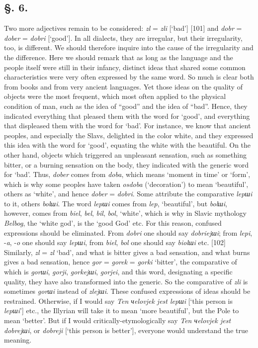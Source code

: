 \subsection*{\hspace*{\fill}§. 6.\hspace*{\fill}}

Two more adjectives remain to be considered: \textit{zl} = \textit{zli} [‘bad’] [101] and \textit{dobr} = \textit{dober} = \textit{dobri} [‘good’]. In all dialects, they are irregular, but their irregularity, too, is different. We should therefore inquire into the cause of the irregularity and the difference. Here we should remark that as long as the language and the people itself were still in their infancy, distinct ideas that shared some common characteristics were very often expressed by the same word. So much is clear both from books and from very ancient languages. Yet those ideas on the quality of objects were the most frequent, which most often applied to the physical condition of man, such as the idea of “good” and the idea of “bad”. Hence, they indicated everything that pleased them with the word for ‘good’, and everything that displeased them with the word for ‘bad’. For instance, we know that ancient peoples, and especially the Slavs, delighted in the color white, and they expressed this idea with the word for ‘good’, equating the white with the beautiful. On the other hand, objects which triggered an unpleasant sensation, such as something bitter, or a burning sensation on the body, they indicated with the generic word for ‘bad’. Thus, \textit{dober} comes from \textit{doba}, which means ‘moment in time’ or ‘form’, which is why some peoples have taken \textit{osdoba} (‘decoration’) to mean ‘beautiful’, others as ‘white’, and hence \textit{dober} = \textit{dobri}. Some attribute the comparative \textit{lepшi} to it, others \textit{bolшi}. The word \textit{lepшi} comes from \textit{lep}, ‘beautiful’, but \textit{bolшi}, however, comes from \textit{biel}, \textit{bel}, \textit{bil}, \textit{bol}, ‘white’, which is why in Slavic mythology \textit{Belbog}, the ‘white god’, is the ‘good God’ etc. For this reason, confused expressions should be eliminated. From \textit{dobri} one should say \textit{dobriejшi}; from \textit{lepi}, -\textit{a}, -\textit{o} one should say \textit{lepшi}, from \textit{biel}, \textit{bol} one should say \textit{biolшi} etc. [102] Similarly, \textit{zl} = \textit{zl} ‘bad’, and what is bitter gives a bad sensation, and what burns gives a bad sensation, hence \textit{gor} = \textit{gorek} = \textit{gorki} ‘bitter’, the comparative of which is \textit{gorшi}, \textit{gorji}, \textit{gorkejшi}, \textit{gorjei}, and this word, designating a specific quality, they have also transformed into the generic. So the comparative of \textit{zli} is sometimes \textit{gorшi} instead of \textit{zlejшi}. These confused expressions of ideas should be restrained. Otherwise, if I would say \textit{Ten чelovjek jest lepшi} [‘this person is \textit{lepшi}’] etc., the Illyrian will take it to mean ‘more beautiful’, but the Pole to mean ‘better’. But if I would critically-etymologically say \textit{Ten чelovjek jest dobrejшi}, or \textit{dobreji} [‘this person is better’], everyone would understand the true meaning.

